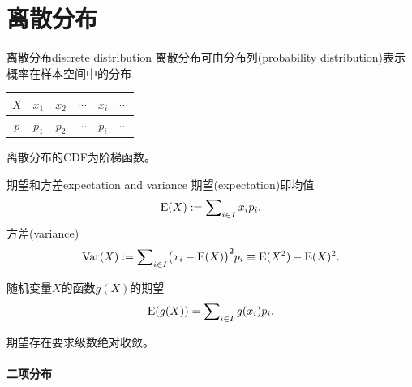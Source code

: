 \section{离散分布}

\begin{definition}{离散分布}{discrete distribution}
	离散分布可由分布列(probability distribution)表示概率在样本空间中的分布
	\begin{center}
		\begin{tabular}{cccccc}
			\toprule
			$X$&$x_1$&$x_2$&$\cdots$&$x_i$&$\cdots$\\
			\midrule
			$p$&$p_1$&$p_2$&$\cdots$&$p_i$&$\cdots$\\
			\bottomrule
		\end{tabular}
	\end{center}
\end{definition}

\begin{corollary}
	离散分布的CDF为阶梯函数。
\end{corollary}

\begin{definition}{期望和方差}{expectation and variance}
	期望(expectation)即均值
	\begin{equation}
		\operatorname{E}(X):=\sum\nolimits_{i\in I}x_ip_i,
	\end{equation}
	方差(variance)
	\begin{equation}
		\operatorname{Var}(X):=\sum\nolimits_{i\in I}\bigl(x_i-\operatorname{E}(X)\bigr)^2p_i\equiv\operatorname{E}(X^2)-\operatorname{E}(X)^2.
	\end{equation}
\end{definition}

\begin{corollary}
	随机变量$X$的函数$g(X)$的期望
	\[
		\operatorname{E}(g(X))=\sum\nolimits_{i\in I}g(x_i)p_i.
	\]
\end{corollary}

\begin{remark}
	期望存在要求级数绝对收敛。
\end{remark}

\paragraph{二项分布}

~

